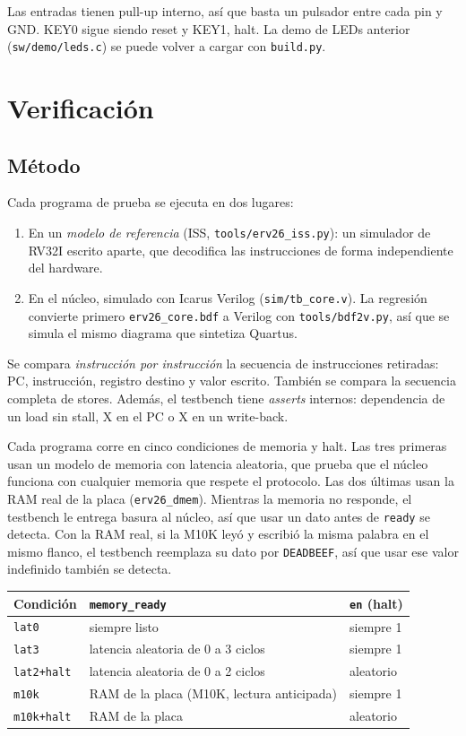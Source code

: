 \documentclass[11pt,a4paper]{article}
\newcommand{\code}[1]{\texttt{#1}}
\begin{document}
Las entradas tienen pull-up interno, así que basta un pulsador entre cada pin y GND. KEY0 sigue siendo reset y KEY1, halt. La demo de LEDs anterior (\code{sw/demo/leds.c}) se puede volver a cargar con \code{build.py}.

\section{Verificación}

\subsection{Método}

Cada programa de prueba se ejecuta en dos lugares:
\begin{enumerate}
\item En un \emph{modelo de referencia} (ISS, \code{tools/erv26\_iss.py}): un simulador de RV32I escrito aparte, que decodifica las instrucciones de forma independiente del hardware.
\item En el núcleo, simulado con Icarus Verilog (\code{sim/tb\_core.v}). La regresión convierte primero \code{erv26\_core.bdf} a Verilog con \code{tools/bdf2v.py}, así que se simula el mismo diagrama que sintetiza Quartus.
\end{enumerate}
Se compara \emph{instrucción por instrucción} la secuencia de instrucciones retiradas: PC, instrucción, registro destino y valor escrito. También se compara la secuencia completa de stores. Además, el testbench tiene \emph{asserts} internos: dependencia de un load sin stall, X en el PC o X en un write-back.

Cada programa corre en cinco condiciones de memoria y halt. Las tres primeras usan un modelo de memoria con latencia aleatoria, que prueba que el núcleo funciona con cualquier memoria que respete el protocolo. Las dos últimas usan la RAM real de la placa (\code{erv26\_dmem}). Mientras la memoria no responde, el testbench le entrega basura al núcleo, así que usar un dato antes de \code{ready} se detecta. Con la RAM real, si la M10K leyó y escribió la misma palabra en el mismo flanco, el testbench reemplaza su dato por \code{DEADBEEF}, así que usar ese valor indefinido también se detecta.

\begin{center}
\begin{tabular}{lll}
\toprule
Condición & \code{memory\_ready} & \code{en} (halt) \\
\midrule
\code{lat0} & siempre listo & siempre 1 \\
\code{lat3} & latencia aleatoria de 0 a 3 ciclos & siempre 1 \\
\code{lat2+halt} & latencia aleatoria de 0 a 2 ciclos & aleatorio \\
\code{m10k} & RAM de la placa (M10K, lectura anticipada) & siempre 1 \\
\code{m10k+halt} & RAM de la placa & aleatorio \\
\bottomrule
\end{tabular}
\end{center}
\end{document}
